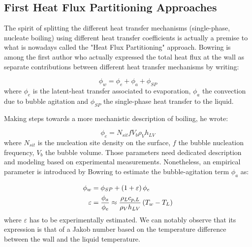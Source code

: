 \subsection{First Heat Flux Partitioning Approaches}

The spirit of splitting the different heat transfer mechanisms (single-phase, nucleate boiling) using different heat transfer coefficients is actually a premise to what is nowadays called the "Heat Flux Partitioning" approach. Bowring \cite{bowring_physical_1962} is among the first author who actually expressed the total heat flux at the wall as separate contributions between different heat transfer mechanisms by writing:

\begin{equation}
\phi_{w} = \phi_{e} + \phi_{a} + \phi_{SP}
\end{equation}
where $\phi_{e}$ is the latent-heat transfer associated to evaporation, $\phi_{a}$ the convection due to bubble agitation and $\phi_{SP}$ the single-phase heat transfer to the liquid. 

\npar

Making steps towards a more mechanistic description of boiling, he wrote:

\begin{equation}
\phi_{e} = N_{sit} f V_{b} \rho_{V} h_{LV}
\end{equation}
where $N_{sit}$ is the nucleation site density on the surface, $f$ the bubble nucleation frequency, $V_{b}$ the bubble volume. Those parameters need dedicated description and modeling based on experimental measurements. Nonetheless, an empirical parameter is introduced by Bowring to estimate the bubble-agitation term $\phi_{a}$ as:

\begin{align}
\phi_{w} &= \phi_{SP} + \left( 1+\varepsilon \right)\phi_{e}\\
\varepsilon &= \dfrac{\phi_{a}}{\phi_{e}} \approx \frac{\rho_{L}c_{p,L}}{\rho_{V}h_{LV}} \left( T_{w} - T_{L} \right)
\end{align}
where $\varepsilon$ has to be experimentally estimated. We can notably observe that its expression is that of a Jakob number based on the temperature difference between the wall and the liquid temperature.

\npar

